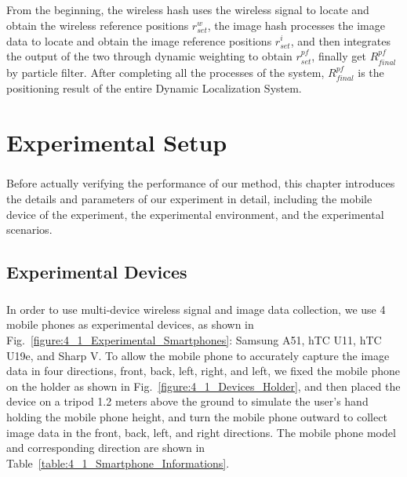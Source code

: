 \documentclass[a4paper,12pt]{report}
\begin{document}
\paragraph{}
From the beginning, the wireless hash uses the wireless signal to locate and obtain the wireless reference positions $r_{set}^{w}$, the image hash processes the image data to locate and obtain the image reference positions $r_{set}^{i}$, and then integrates the output of the two through dynamic weighting to obtain $r_{set}^{pf}$, finally get $R_{final}^{pf}$ by particle filter. After completing all the processes of the system, $R_{final}^{pf}$ is the positioning result of the entire Dynamic Localization System.
%

\chapter{Experimental Setup}

\paragraph{}
Before actually verifying the performance of our method, this chapter introduces the details and parameters of our experiment in detail, including the mobile device of the experiment, the experimental environment, and the experimental scenarios.

\section{Experimental Devices}

\paragraph{}
In order to use multi-device wireless signal and image data collection, we use 4 mobile phones as experimental devices, as shown in Fig.~\ref{figure:4_1_Experimental_Smartphones}: Samsung A51, hTC U11, hTC U19e, and Sharp V. To allow the mobile phone to accurately capture the image data in four directions, front, back, left, right, and left, we fixed the mobile phone on the holder as shown in Fig.~\ref{figure:4_1_Devices_Holder}, and then placed the device on a tripod 1.2 meters above the ground to simulate the user's hand holding the mobile phone height, and turn the mobile phone outward to collect image data in the front, back, left, and right directions. The mobile phone model and corresponding direction are shown in Table~\ref{table:4_1_Smartphone_Informations}.
\end{document}
